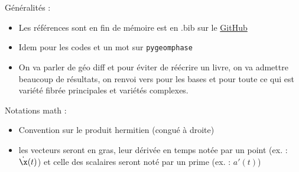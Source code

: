 \\ \\
Généralités :
\begin{itemize}
	
	\item Les références sont en fin de mémoire est en .bib sur le \href{https://github.com/GregoireDoat/StageM2}{GitHub}
	
	\item Idem pour les codes et un mot sur \texttt{pygeomphase}

	\item On va parler de géo diff et pour éviter de réécrire un livre, on va admettre beaucoup de résultats, on renvoi vers \cite{lafontaine_introduction_2015,do_carmo_riemannian_1992} pour les bases et  \cite{nakahara_geometry_2003,pham_mau_quan_introduction_1969,ballmann_lectures_2006} pour toute ce qui est variété fibrée principales et variétés complexes.
	
\end{itemize}
\skipl

Notations math :
\begin{itemize}
	
	\item Convention sur le produit hermitien (congué à droite)
	
	\item les vecteurs seront en gras, leur dérivée en temps notée par un point (ex. : $\dot{\x}(t)$) et celle des scalaires seront noté par un prime (ex. : $a'(t)$)
	
\end{itemize}
\skipl



\newpage










